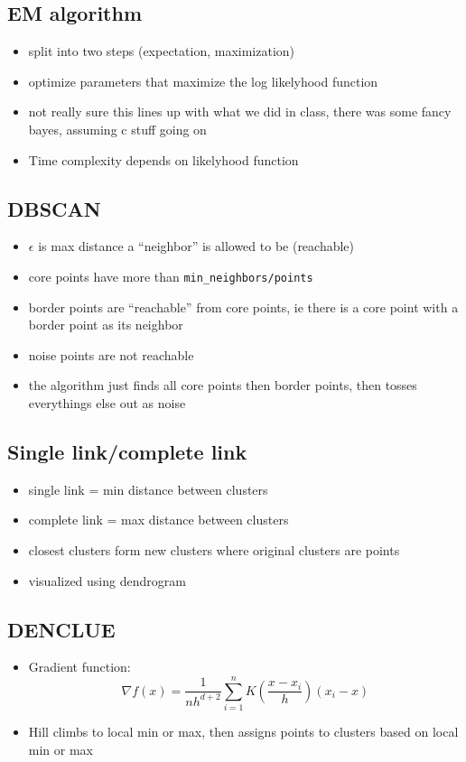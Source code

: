 \documentclass[11pt]{article}
\begin{document}
\subsection*{EM algorithm}
\label{sec:org73c94c3}
\begin{itemize}
\item split into two steps (expectation, maximization)
\item optimize parameters that maximize the log likelyhood function
\item not really sure this lines up with what we did in class, there was some fancy
bayes, assuming c stuff going on
\item Time complexity depends on likelyhood function
\end{itemize}
\subsection*{DBSCAN}
\label{sec:org6204073}
\begin{itemize}
\item \(\epsilon\) is max distance a ``neighbor'' is allowed to be (reachable)
\item core points have more than \texttt{min\_neighbors/points}
\item border points are ``reachable'' from core points, ie there is a core point with
a border point as its neighbor
\item noise points are not reachable
\item the algorithm just finds all core points then border points, then tosses
everythings else out as noise
\end{itemize}
\subsection*{Single link/complete link}
\label{sec:org28f32ff}
\begin{itemize}
\item single link = min distance between clusters
\item complete link = max distance between clusters
\item closest clusters form new clusters where original clusters are points
\item visualized using dendrogram
\end{itemize}
\subsection*{DENCLUE}
\label{sec:org3679943}
\begin{itemize}
\item Gradient function: \[\nabla f(x) = \frac{1}{nh^{d+2}}\sum \limits^n_{i=1}K\left(\frac{x-x_i}{h}\right)(x_i-x)\]
\item Hill climbs to local min or max, then assigns points to clusters based on
local min or max
\end{itemize}
\end{document}
